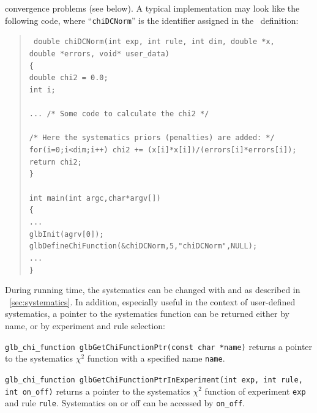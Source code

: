  convergence problems (see below).
A typical implementation may look like the following code, where ``{\tt chiDCNorm}'' is the identifier
assigned in the \AEDL\ definition:
\begin{quote}
{\tt
  double chiDCNorm(int exp, int rule, int dim, double *x, \\
  \hspace*{0.5cm} double *errors, void* user\_data) \\
  \{ \\
   \hspace*{0.5cm} double chi2 = 0.0; \\
   \hspace*{0.5cm} int i; \\
   \\
   \hspace*{0.5cm} ... /* Some code to calculate the chi2 */ \\
   \\
    \hspace*{0.5cm} /* Here the systematics priors (penalties) are added: */ \\
    \hspace*{0.5cm} for(i=0;i<dim;i++) chi2 += (x[i]*x[i])/(errors[i]*errors[i]);
    \hspace*{0.5cm} return chi2; \\
  \} \\
   \\
  int main(int argc,char*argv[]) \\
 \{ \\ 
  \hspace*{0.5cm} ... \\
  \hspace*{0.5cm} glbInit(agrv[0]); \\
  \hspace*{0.5cm} glbDefineChiFunction(\&chiDCNorm,5,"chiDCNorm",NULL); \\
  \hspace*{0.5cm} ... \\
 \} \\
}
\end{quote}

During running time, the systematics can be changed with 
 and  as described in \Sec~\ref{sec:systematics}.
In addition, especially useful in the context of user-defined systematics, a pointer to the systematics function can be returned either by name, or by experiment and rule selection:
\begin{function}
{\tt glb\_chi\_function glbGetChiFunctionPtr(const char *name)}
returns a pointer to the systematics $\chi^2$ function with a specified name {\tt name}.
\end{function}
\begin{function}
{\tt glb\_chi\_function glbGetChiFunctionPtrInExperiment(int exp, int rule, int on\_off)}
returns a pointer to the systematics $\chi^2$ function of experiment {\tt exp} and rule {\tt rule}.
Systematics on or off can be accessed by {\tt on\_off}.
\end{function}

